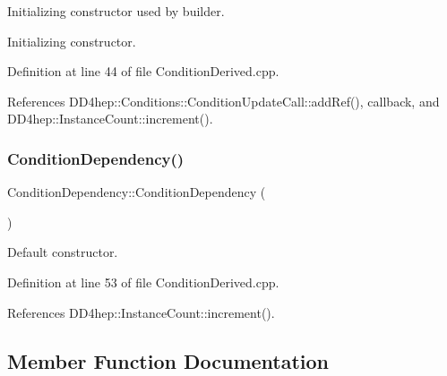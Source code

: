 Initializing constructor used by builder. 

Initializing constructor. 

Definition at line 44 of file Condition\+Derived.\+cpp.



References D\+D4hep\+::\+Conditions\+::\+Condition\+Update\+Call\+::add\+Ref(), callback, and D\+D4hep\+::\+Instance\+Count\+::increment().

\hypertarget{class_d_d4hep_1_1_conditions_1_1_condition_dependency_a9468a2ef21f829e7acf1569392ba2711}{}\label{class_d_d4hep_1_1_conditions_1_1_condition_dependency_a9468a2ef21f829e7acf1569392ba2711} 
\subsubsection{\texorpdfstring{Condition\+Dependency()}{ConditionDependency()}\hspace{0.1cm}{\footnotesize\ttfamily [4/4]}}
{\footnotesize\ttfamily Condition\+Dependency\+::\+Condition\+Dependency (\begin{DoxyParamCaption}{ }\end{DoxyParamCaption})}



Default constructor. 



Definition at line 53 of file Condition\+Derived.\+cpp.



References D\+D4hep\+::\+Instance\+Count\+::increment().



\subsection{Member Function Documentation}
\hypertarget{class_d_d4hep_1_1_conditions_1_1_condition_dependency_a84b132a3ba867a4588d34e75e8fc297a}{}\label{class_d_d4hep_1_1_conditions_1_1_condition_dependency_a84b132a3ba867a4588d34e75e8fc297a} 
